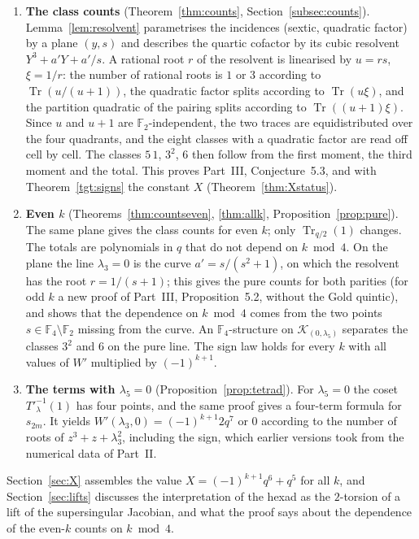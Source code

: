 \documentclass[12pt,a4paper]{amsart}
\theoremstyle{definition}
\newcommand{\F}{\mathbb{F}}
\newcommand{\Tr}{\operatorname{Tr}}
\newcommand{\Kk}{\mathcal{K}}
\begin{document}
\begin{enumerate}[label=(\roman*),leftmargin=2em,resume]
\item \textbf{The class counts} (Theorem~\ref{thm:counts}, Section~\ref{subsec:counts}). Lemma~\ref{lem:resolvent} parametrises the incidences (sextic, quadratic factor) by a plane $(y,s)$ and describes the quartic cofactor by its cubic resolvent $Y^3+a'Y+a'/s$. A rational root $r$ of the resolvent is linearised by $u=rs$, $\xi=1/r$: the number of rational roots is $1$ or $3$ according to $\Tr(u/(u+1))$, the quadratic factor splits according to $\Tr(u\xi)$, and the partition quadratic of the pairing splits according to $\Tr((u+1)\xi)$. Since $u$ and $u+1$ are $\F_2$-independent, the two traces are equidistributed over the four quadrants, and the eight classes with a quadratic factor are read off cell by cell. The classes $5\,1$, $3^2$, $6$ then follow from the first moment, the third moment and the total. This proves Part~III, Conjecture~5.3, and with Theorem~\ref{tgt:signs} the constant $X$ (Theorem~\ref{thm:Xstatus}).
\item \textbf{Even $k$} (Theorems~\ref{thm:countseven}, \ref{thm:allk}, Proposition~\ref{prop:pure}). The same plane gives the class counts for even $k$; only $\Tr_{q/2}(1)$ changes. The totals are polynomials in $q$ that do not depend on $k\bmod4$. On the plane the line $\lambda_3=0$ is the curve $a'=s/(s^2+1)$, on which the resolvent has the root $r=1/(s+1)$; this gives the pure counts for both parities (for odd $k$ a new proof of Part~III, Proposition~5.2, without the Gold quintic), and shows that the dependence on $k\bmod4$ comes from the two points $s\in\F_4\setminus\F_2$ missing from the curve. An $\F_4$-structure on $\Kk_{(0,\lambda_5)}$ separates the classes $3^2$ and $6$ on the pure line. The sign law holds for every $k$ with all values of $W'$ multiplied by $(-1)^{k+1}$.
\item \textbf{The terms with $\lambda_5=0$} (Proposition~\ref{prop:tetrad}). For $\lambda_5=0$ the coset $T'^{-1}_\lambda(1)$ has four points, and the same proof gives a four-term formula for $s_{2m}$. It yields $W'(\lambda_3,0)=(-1)^{k+1}2q^7$ or $0$ according to the number of roots of $z^3+z+\lambda_3^2$, including the sign, which earlier versions took from the numerical data of Part~II.
\end{enumerate}
Section~\ref{sec:X} assembles the value $X=(-1)^{k+1}q^6+q^5$ for all $k$, and Section~\ref{sec:lifts} discusses the interpretation of the hexad as the $2$-torsion of a lift of the supersingular Jacobian, and what the proof says about the dependence of the even-$k$ counts on $k\bmod4$.
\end{document}
